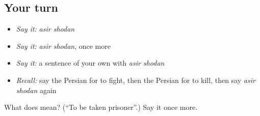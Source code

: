 \subsection*{Your turn}
\begin{itemize}
\raggedright
  \item \emph{Say it:} \emph{asir shodan}
  \item \emph{Say it:} \emph{asir shodan}, once more
  \item \emph{Say it:} a sentence of your own with \emph{asir shodan}
  \item \emph{Recall:} say the Persian for to fight, then the Persian for to kill, then say \emph{asir shodan} again
\end{itemize}

\begin{tcolorbox}[breakable,colback=teal!4,colframe=teal!35!black,title={Before you move on}]
What does   mean? (\textquotedblleft{}To be taken prisoner\textquotedblright{}.) Say it once more.
\end{tcolorbox}
